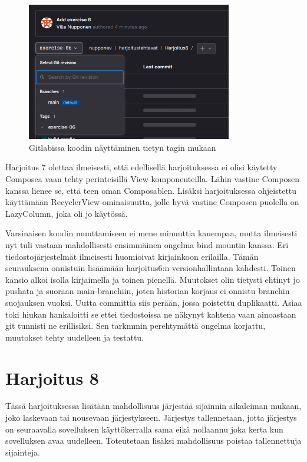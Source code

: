 \begin{figure}[!ht]
    \centering
    \includegraphics[width=0.8\textwidth]{figures/gitlab-change-branch-to-tag.png}
    \caption{Gitlabissa koodin näyttäminen tietyn tagin mukaan}
    \label{fig:gitlab-change-branch-to-tag}
\end{figure}

Harjoitus 7 olettaa ilmeisesti, että edellisellä harjoituksessa ei olisi
käytetty Composea vaan tehty perinteisillä View komponenteilla. Lähin vastine
Composen kanssa lienee se, että teen oman Composablen. Lisäksi harjoituksessa
ohjeistettu käyttämään RecyclerView-ominaisuutta, jolle hyvä vastine Composen
puolella on LazyColumn, joka oli jo käytössä.

Varsinaisen koodin muuttamiseen ei mene minuuttia kauempaa, mutta ilmeisesti
nyt tuli vastaan mahdollisesti ensimmäinen ongelma bind mountin kanssa. Eri
tiedostojärjestelmät ilmeisesti huomioivat kirjainkoon erilailla. Tämän
seurauksena onnistuin lisäämään harjoitus6:n versionhallintaan kahdesti. Toinen
kansio alkoi isolla kirjaimella ja toinen pienellä. Muutokset olin tietysti
ehtinyt jo pushata ja suoraan main-branchiin, joten historian korjaus ei
onnistu branchin suojauksen vuoksi. Uutta committia siis perään, jossa
poistettu duplikaatti. Asiaa toki hiukan hankaloitti se ettei tiedostoissa ne
näkynyt kahtena vaan ainoastaan git tunnisti ne erillisiksi. Sen tarkmmin
perehtymättä ongelma korjattu, muutokset tehty uudelleen ja testattu.

\section{Harjoitus 8}

Tässä harjoituksessa lisätään mahdollisuus järjestää sijainnin aikaleiman
mukaan, joko laskevaan tai nousevaan järjestykseen. Järjestys tallennetaan,
jotta järjestys on seuraavalla sovelluksen käyttökerralla sama eikä nollaannu
joka kerta kun sovelluksen avaa uudelleen. Toteutetaan lisäksi mahdollisuus
poistaa tallennettuja sijainteja.

